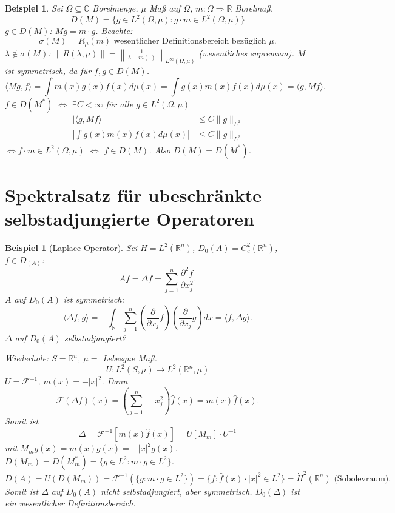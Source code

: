\documentclass[12pt]{extreport} %
\newtheorem{Beispiel}[Satz]{Beispiel}
\numberwithin{equation}{section}
\newcommand{\C}{\mathbb{C}} %
\newcommand{\R}{\mathbb{R}} %
\newcommand{\f}{\hat{f}}
\newcommand{\F}{\mathcal{F}}
\newcommand{\m}{\cdot}
\newcommand{\laplace}{\Delta}
\begin{document}
\begin{Beispiel}
	Sei $\Omega\subseteq \C$ Borelmenge, $\mu$ Maß auf $\Omega$, $m\colon \Omega\Rightarrow \R$ Borelmaß. 
	$$D(M) = \{g\in L^2(\Omega, \mu)\colon g\m m\in L^2(\Omega, \mu) \}$$
	$g\in D(M)$: $Mg = m\m g$. Beachte:
	$$\sigma(M) = R_\mu(m) \text{ wesentlicher Definitionsbereich bezüglich }\mu.$$
	$\lambda \notin \sigma(M)$: $\|R(\lambda,\mu)\| = \left\| \frac{1}{\lambda - m(\m)}\right\|_{L^\infty(\Omega,\mu)}$ (wesentliches supremum). $M$ ist symmetrisch, da für $f,g\in D(M)$.
	$$\langle Mg, f\rangle = \int m(x)g(x) f(x) d\mu(x) = \int g(x)m(x)f(x)d\mu(x) = \langle g, Mf\rangle.$$
	$f\in D(M^*)$ $\Leftrightarrow$ $\exists C<\infty$ für alle $g\in L^2(\Omega,\mu)$
	\begin{align*}
		|\langle g, Mf\rangle| &\leq C\|g\|_{L^2}\\
		\left|\int g(x)m(x)f(x)d\mu(x)\right|&\leq C\|g\|_{L^2}
	\end{align*}
	$\Leftrightarrow f\m m\in L^2(\Omega,\mu)$ $\Leftrightarrow$ $f\in D(M)$. Also $D(M) = D(M^*)$.
\end{Beispiel}

\section{Spektralsatz für ubeschränkte selbstadjungierte Operatoren}

\begin{Beispiel}[Laplace Operator]
	Sei $H = L^2(\R^n)$, $D_0(A) = C_c^2(\R^n)$, $f\in D_(A)$: $$Af = \laplace f = \sum_{j = 1}^{n} \frac{\partial^2 f}{\partial x_j^2}.$$
	$A$ auf $D_0(A)$ ist symmetrisch:
	$$\langle \laplace f,g\rangle = -\int_{\R}\sum_{j = 1}^{n}\left(\frac{\partial}{\partial x_j}f \right)\left(\frac{\partial}{\partial x_j}g \right)dx = \langle f, \laplace g\rangle.$$
	$\laplace$ auf $D_0(A)$ selbstadjungiert?
	
	Wiederhole: $S=\R^n$, $\mu=$ Lebesgue Maß.
	$$U\colon L^2(S,\mu)\rightarrow L^2(\R^n, \mu)$$
	$U = \F^{-1}$, $m(x) = -|x|^2$. Dann 
	$$\F(\laplace f) (x) = \left(\sum_{j = 1}^{n} - x_j^2 \right)\f(x) = m(x)\f(x).$$
	Somit ist 
	$$\laplace = \F^{-1}[m(x)\f(x)] = U[M_m]\m U^{-1}$$ 
	mit $M_m g(x) = m(x)g(x) = -|x|^2g(x)$. $D(M_m) = D(M_m^*) = \{g\in L^2\colon m\m g \in L^2 \}$.
	$$D(A) = U(D(M_m)) = \F^{-1}(\{g\colon m\m g\in L^2 \}) = \{f\colon \f(x)\m|x|^2\in L^2 \} = \boxed{\dot H^2 (\R^n)} \text{ (Sobolevraum)}.$$ 
	Somit ist $\laplace$ auf $D_0(A)$ nicht selbstadjungiert, aber symmetrisch. $D_0(\laplace)$ ist ein wesentlicher Definitionsbereich.
\end{Beispiel}
\end{document}
